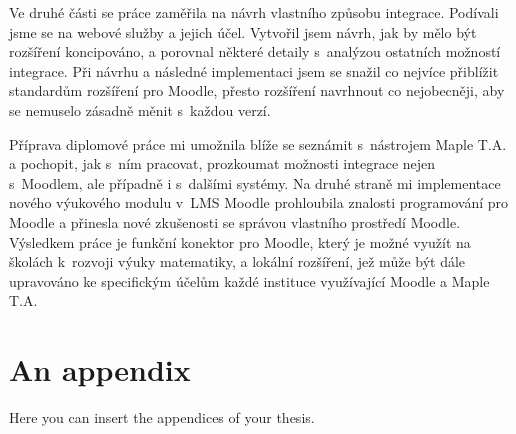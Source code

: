 \documentclass[
print,
  11pt,
  table,   
  nolof,    
  nolot,
  oneside,
  draft
]{fithesis3}
\begin{document}
Ve druhé části se práce zaměřila na návrh vlastního způsobu integrace. Podívali jsme se na webové služby a jejich účel. Vytvořil jsem návrh, jak by mělo být rozšíření koncipováno, a porovnal některé detaily s~analýzou ostatních možností integrace. Při návrhu a následné implementaci jsem se snažil co nejvíce přiblížit standardům rozšíření pro Moodle, přesto rozšíření navrhnout co nejobecněji, aby se nemuselo zásadně měnit s~každou verzí.

Příprava diplomové práce mi umožnila blíže se seznámit s~nástrojem Maple T.A. a pochopit, jak s~ním pracovat, prozkoumat možnosti integrace nejen s~Moodlem, ale případně i s~dalšími systémy. Na druhé straně mi implementace nového výukového modulu v~LMS Moodle prohloubila znalosti programování pro Moodle a přinesla nové zkušenosti se správou vlastního prostředí Moodle. Výsledkem práce je funkční konektor pro Moodle, který je možné využít na školách k~rozvoji výuky matematiky, a lokální rozšíření, jež může být dále upravováno ke specifickým účelům každé instituce využívající Moodle a Maple T.A.




\printbibliography[heading=bibintoc]
\listoffigures
\listoftables




\makeatletter\thesis@blocks@clear\makeatother
{} %

\makeatletter\thesis@blocks@clear\makeatother

\renewcommand{\theHchapter}{A\arabic{chapter}}
\appendix %

\chapter{An appendix}
Here you can insert the appendices of your thesis.
\end{document}
